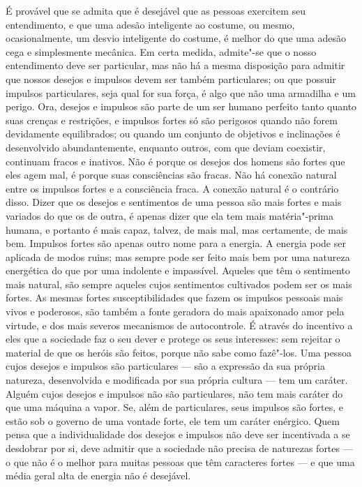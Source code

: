 É provável que se admita que é desejável que as pessoas
exercitem seu entendimento, e que uma adesão inteligente
ao costume, ou mesmo, ocasionalmente, um desvio inteligente
do costume, é melhor do que uma adesão cega e simplesmente mecânica. 
Em certa medida, admite"-se que o nosso entendimento
deve ser particular, mas não há a mesma disposição para admitir
que nossos desejos e impulsos devem ser também particulares; ou que
possuir impulsos particulares, seja qual for sua força, é algo que não uma
armadilha e um perigo. Ora, desejos e impulsos são parte de um
ser humano perfeito tanto quanto suas crenças e restrições, e impulsos fortes 
só são perigosos quando não forem devidamente equilibrados; ou quando um conjunto de objetivos
e inclinações é desenvolvido abundantemente, enquanto outros, com que deviam
coexistir, continuam fracos e inativos. Não é porque os desejos dos homens
são fortes que eles agem mal, é porque suas consciências
são fracas. Não há conexão natural entre os impulsos fortes e a
consciência fraca. A conexão natural é o contrário disso. Dizer que
os desejos e sentimentos de uma pessoa são mais fortes e mais variados do que
os de outra, é apenas dizer que ela tem mais matéria"-prima
humana, e portanto é mais capaz, talvez, de mais mal, mas
certamente, de mais bem. Impulsos fortes são apenas outro nome para a energia.
A energia pode ser aplicada de modos ruins; mas sempre pode ser feito mais bem
por uma natureza energética do que por uma indolente e impassível. Aqueles que
têm o sentimento mais natural, são sempre aqueles cujos sentimentos cultivados
podem ser os mais fortes. As mesmas fortes susceptibilidades que fazem
os impulsos pessoais mais vivos e poderosos, são também a fonte geradora 
do mais apaixonado amor pela virtude, e dos mais severos
mecanismos de autocontrole. É através do incentivo a eles que a sociedade
faz o seu dever e protege os seus interesses: sem rejeitar o material de
que os heróis são feitos, porque não sabe como fazê"-los. Uma pessoa
cujos desejos e impulsos são particulares --- são a expressão da sua própria
natureza, desenvolvida e modificada por sua própria cultura --- tem
um caráter. Alguém cujos desejos e impulsos não são
particulares, não tem mais caráter do que uma máquina a vapor.
Se, além de particulares, seus impulsos são fortes, e estão
sob o governo de uma vontade forte, ele tem um caráter enérgico.
Quem pensa que a individualidade dos desejos e impulsos não deve
ser incentivada a se desdobrar por si, deve admitir que a sociedade não precisa
de naturezas fortes --- o que não é o melhor para muitas pessoas que
têm caracteres fortes --- e que uma média geral alta de energia não é desejável.

